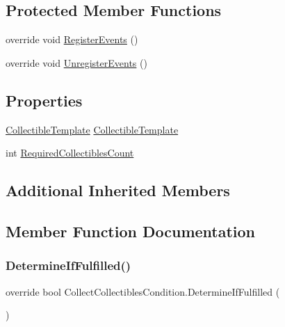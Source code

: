 \subsection*{Protected Member Functions}
\begin{DoxyCompactItemize}
\item 
override void \mbox{\hyperlink{class_collect_collectibles_condition_aaf2fbca5108425f47cd8628fd36bef43}{Register\+Events}} ()
\item 
override void \mbox{\hyperlink{class_collect_collectibles_condition_adfbda80d4c99e54f20ae0e511654a80d}{Unregister\+Events}} ()
\end{DoxyCompactItemize}
\subsection*{Properties}
\begin{DoxyCompactItemize}
\item 
\mbox{\hyperlink{class_collectible_template}{Collectible\+Template}} \mbox{\hyperlink{class_collect_collectibles_condition_aa8c0bdb17c005b577b474b03e79c194d}{Collectible\+Template}}
\item 
int \mbox{\hyperlink{class_collect_collectibles_condition_a3ef34344195a7d2014417ce976ef81b3}{Required\+Collectibles\+Count}}
\end{DoxyCompactItemize}
\subsection*{Additional Inherited Members}


\subsection{Member Function Documentation}
\mbox{\label{class_collect_collectibles_condition_af61a1a03224942635451d7d63a886adf}} 
\subsubsection{\texorpdfstring{Determine\+If\+Fulfilled()}{DetermineIfFulfilled()}}
{\footnotesize\ttfamily override bool Collect\+Collectibles\+Condition.\+Determine\+If\+Fulfilled (\begin{DoxyParamCaption}{ }\end{DoxyParamCaption})\hspace{0.3cm}{\ttfamily [virtual]}}



